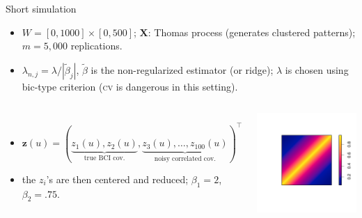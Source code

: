 \documentclass[serif]{beamer}
\newcommand{\bX}{\mathbf{X}}
\newcommand{\bz}{\mathbf{z}}
\begin{document}
\begin{frame}{Short simulation}

\vspace*{-.2cm}

\begin{itemize}
	\item $W=[0,1000]\times [0,500]$; $\bX$: Thomas process (generates clustered patterns); $m=5,\!000$ replications.
	\item $\lambda_{n,j}= \lambda / |\tilde \beta_j|$, $\tilde \beta$ is the non-regularized estimator (or ridge); $\lambda$ is chosen using {\sc bic}-type criterion (\textsc{cv} is dangerous in this setting).
	
\end{itemize}

\vspace*{-.5cm}

\begin{columns}
\column{8cm}
\begin{itemize}
	\item $\bz(u) = (\underbrace{z_1(u),z_2(u)}_{\text{true BCI cov.}},\underbrace{z_3(u),\dots,z_{100}(u)}_{\text{noisy correlated cov.}})^\top$
	\item the $z_i$'s are then centered and reduced; $\beta_1=2$, $\beta_2=.75$.
\end{itemize}
\column{4cm}
\includegraphics[scale=.3]{corrX}
\end{columns}



\end{frame}
\end{document}
